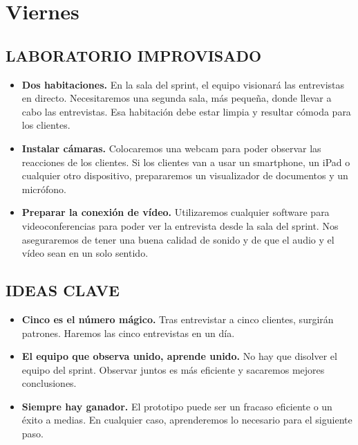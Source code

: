 \documentclass[10pt]{article}
\begin{document}
\section*{\center Viernes}
\begin{multicols}{2}
\subsection*{LABORATORIO IMPROVISADO}
\begin{itemize}
\item \textbf{Dos habitaciones.} En la sala del sprint, el equipo visionará las entrevistas en directo. Necesitaremos una segunda sala, más pequeña, donde llevar a cabo las entrevistas. Esa habitación debe estar limpia y resultar cómoda para los clientes.
\item \textbf{Instalar cámaras.} Colocaremos una webcam para poder observar las reacciones de los clientes. Si los clientes van a usar un smartphone, un iPad o cualquier otro dispositivo, prepararemos un visualizador de documentos y un micrófono.
\item \textbf{Preparar la conexión de vídeo.} Utilizaremos cualquier software para videoconferencias para poder ver la entrevista desde la sala del sprint. Nos aseguraremos de tener una buena calidad de sonido y de que el audio y el vídeo sean en un solo sentido.
\end{itemize}
\subsection*{IDEAS CLAVE}
\begin{itemize}
\item \textbf{Cinco es el número mágico.} Tras entrevistar a cinco
clientes, surgirán patrones. Haremos las cinco entrevistas en un día.
\item \textbf{El equipo que observa unido, aprende unido.} No hay que disolver el equipo del sprint. Observar juntos es más eficiente y sacaremos mejores conclusiones.
\item \textbf{Siempre hay ganador.} El prototipo puede ser un fracaso eficiente o un éxito a medias. En cualquier caso, aprenderemos lo necesario para el siguiente paso.
\end{itemize}

\end{multicols}
\end{document}

